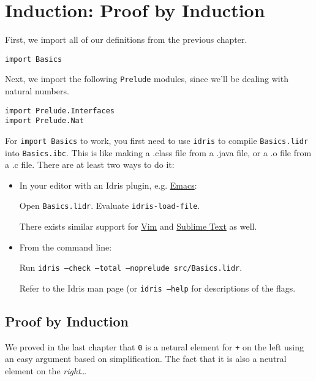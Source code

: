 \chapter{Induction: Proof by
Induction}\label{induction-proof-by-induction}

First, we import all of our definitions from the previous chapter.

\begin{verbatim}
import Basics
\end{verbatim}

Next, we import the following \texttt{Prelude} modules,
since we'll be dealing with natural numbers.

\begin{verbatim}
import Prelude.Interfaces
import Prelude.Nat
\end{verbatim}

For \texttt{import Basics} to work, you first need to use
\texttt{idris} to compile \texttt{Basics.lidr}
into \texttt{Basics.ibc}. This is like making a .class file
from a .java file, or a .o file from a .c file. There are at least two
ways to do it:

\begin{itemize}
\item
  In your editor with an Idris plugin, e.g.
  \href{https://github.com/idris-hackers/idris-mode}{Emacs}:

  Open \texttt{Basics.lidr}. Evaluate
  \texttt{idris-load-file}.

  There exists similar support for
  \href{https://github.com/idris-hackers/idris-vim}{Vim} and
  \href{https://github.com/idris-hackers/idris-sublime}{Sublime Text} as
  well.
\item
  From the command line:

  Run
  \texttt{idris --check --total --noprelude src/Basics.lidr}.

  Refer to the Idris man page (or \texttt{idris --help} for
  descriptions of the flags.
\end{itemize}

\section{Proof by Induction}\label{proof-by-induction}

We proved in the last chapter that \texttt{0} is a netural
element for \texttt{+} on the left using an easy argument
based on simplification. The fact that it is also a neutral element on
the \emph{right}\ldots{}

